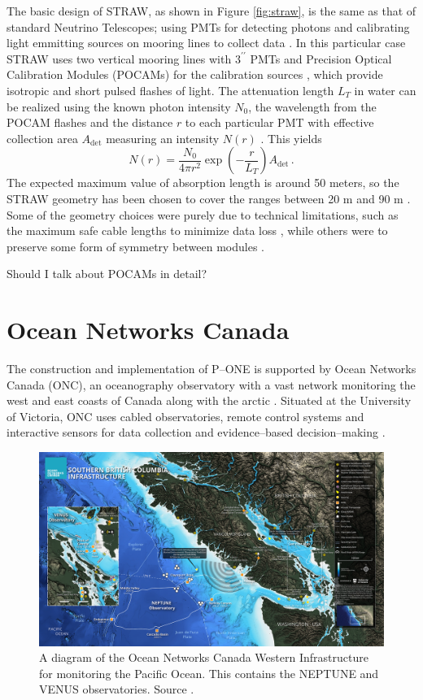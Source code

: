 The basic design of STRAW, as shown in Figure \ref{fig:straw}, is the same as that of standard Neutrino Telescopes; using PMTs for detecting photons and calibrating light emmitting sources on mooring lines to collect data \cite{straw}. In this particular case STRAW uses two vertical mooring lines with $3^{\prime\prime}$ PMTs and Precision Optical Calibration Modules (POCAMs) for the calibration sources \cite{straw}, which provide isotropic and short pulsed flashes of light. The attenuation length $L_{T}$ in water can be realized using the known photon intensity $N_{0}$, the wavelength from the POCAM flashes and the distance $r$ to each particular PMT with effective collection area $A_{\text{det}}$ measuring an intensity $N(r)$ \cite{straw}. This yields
\begin{equation}
  N(r) = \frac{N_{0}}{4\pi r^{2}}\exp\left(-\frac{r}{L_{T}}\right)A_{\text{det}}\, .
\end{equation}
The expected maximum value of absorption length is around 50 meters, so the STRAW geometry has been chosen to cover the ranges between 20 m and 90 m \cite{straw}. Some of the geometry choices were purely due to technical limitations, such as the maximum safe cable lengths to minimize data loss \cite{straw}, while others were to preserve some form of symmetry between modules \cite{straw}.

Should I talk about POCAMs in detail? \cite{pocam}

\section{Ocean Networks Canada}

The construction and implementation of P--ONE is supported by Ocean Networks Canada (ONC), an oceanography observatory with a vast network monitoring the west and east coasts of Canada along with the arctic \cite{onc}. Situated at the University of Victoria, ONC uses cabled observatories, remote control systems and interactive sensors for data collection and evidence--based decision--making \cite{onc}. 

\begin{figure}[h]
  \centering
  \includegraphics[width=.9\textwidth]{./Figures/western_infrastructure.png}
  \caption{A diagram of the Ocean Networks Canada Western Infrastructure for monitoring the Pacific Ocean. This contains the NEPTUNE and VENUS observatories. Source \cite{onc}.}
  \label{fig:west_inf}
\end{figure}

